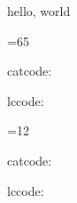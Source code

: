 \documentclass{article}
\begin{document}
hello, world

=65

catcode: \the{}

lccode: \the{}

=12

catcode: \the{}

lccode: \the{}
\end{document}
